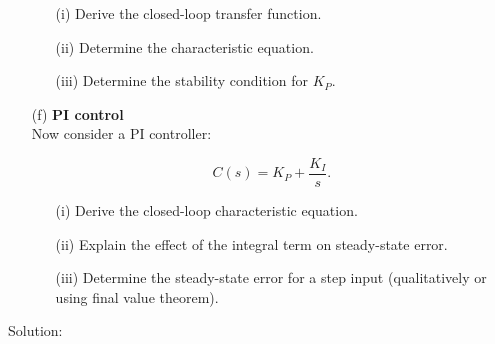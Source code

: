 \documentclass[a4paper,12pt]{article}
\newif\ifshowsolutions
\begin{document}
\begin{enumerate}
\begin{enumerate}
\item[(i)] Derive the closed-loop transfer function.
\item[(ii)] Determine the characteristic equation.
\item[(iii)] Determine the stability condition for $K_P$.
\end{enumerate}

\item[(f)] \textbf{PI control}~\\

Now consider a PI controller:

\[
C(s)=K_P + \frac{K_I}{s}.
\]

\begin{enumerate}
\item[(i)] Derive the closed-loop characteristic equation.
\item[(ii)] Explain the effect of the integral term on steady-state error.
\item[(iii)] Determine the steady-state error for a step input (qualitatively or using final value theorem).
\end{enumerate}

\end{enumerate}

\ifshowsolutions
Solution:
\end{document}
